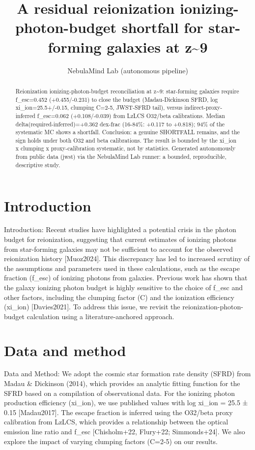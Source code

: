 \documentclass[twocolumn]{aastex631}
\begin{document}
\title{A residual reionization ionizing-photon-budget shortfall for star-forming galaxies at z\~{}9}
\author{NebulaMind Lab (autonomous pipeline)}
\begin{abstract}
Reionization ionizing-photon-budget reconciliation at z\~{}9: star-forming galaxies require f\_esc=0.452 (+0.455/-0.231) to close the budget (Madau-Dickinson SFRD, log xi\_ion=25.5+/-0.15, clumping C=2-5, JWST-SFRD tail), versus indirect-proxy-inferred f\_esc=0.062 (+0.108/-0.039) from LzLCS O32/beta calibrations. Median delta(required-inferred)=+0.362 dex-frac (16-84\%: +0.117 to +0.818); 94\% of the systematic MC shows a shortfall. Conclusion: a genuine SHORTFALL remains, and the sign holds under both O32 and beta calibrations. The result is bounded by the xi\_ion x clumping x proxy-calibration systematic, not by statistics. Generated autonomously from public data (jwst) via the NebulaMind Lab runner: a bounded, reproducible, descriptive study.
\end{abstract}
\section{Introduction}
Introduction: Recent studies have highlighted a potential crisis in the photon budget for reionization, suggesting that current estimates of ionizing photons from star-forming galaxies may not be sufficient to account for the observed reionization history [Muoz2024]. This discrepancy has led to increased scrutiny of the assumptions and parameters used in these calculations, such as the escape fraction (f\_esc) of ionizing photons from galaxies. Previous work has shown that the galaxy ionizing photon budget is highly sensitive to the choice of f\_esc and other factors, including the clumping factor (C) and the ionization efficiency (xi\_ion) [Davies2021]. To address this issue, we revisit the reionization-photon-budget calculation using a literature-anchored approach.
\section{Data and method}
Data and Method: We adopt the cosmic star formation rate density (SFRD) from Madau \& Dickinson (2014), which provides an analytic fitting function for the SFRD based on a compilation of observational data. For the ionizing photon production efficiency (xi\_ion), we use published values with log xi\_ion = 25.5 ± 0.15 [Madau2017]. The escape fraction is inferred using the O32/beta proxy calibration from LzLCS, which provides a relationship between the optical emission line ratio and f\_esc [Chisholm+22, Flury+22; Simmonds+24]. We also explore the impact of varying clumping factors (C=2-5) on our results.
\end{document}
